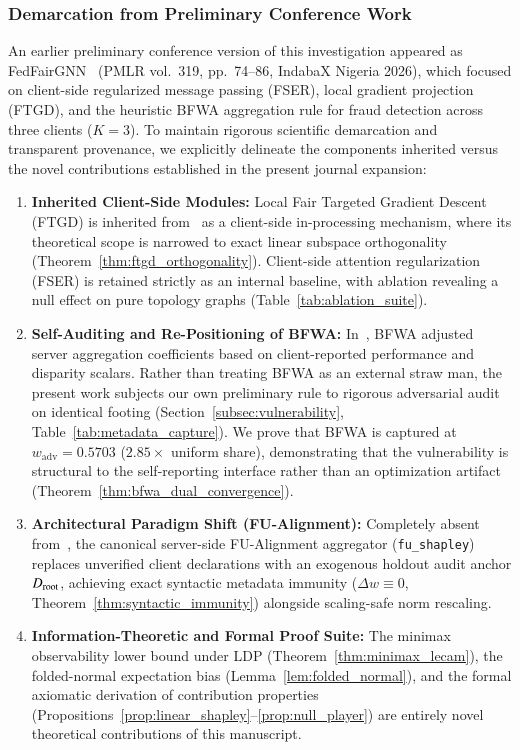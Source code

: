 \subsubsection{Demarcation from Preliminary Conference Work}
An earlier preliminary conference version of this investigation appeared as FedFairGNN~\citep{dang2026fedfairgnn} (PMLR vol.~319, pp.~74--86, IndabaX Nigeria 2026), which focused on client-side regularized message passing (FSER), local gradient projection (FTGD), and the heuristic BFWA aggregation rule for fraud detection across three clients ($K=3$). To maintain rigorous scientific demarcation and transparent provenance, we explicitly delineate the components inherited versus the novel contributions established in the present journal expansion:
\begin{enumerate}[leftmargin=*]
    \item \textbf{Inherited Client-Side Modules:} Local Fair Targeted Gradient Descent (FTGD) is inherited from~\citep{dang2026fedfairgnn} as a client-side in-processing mechanism, where its theoretical scope is narrowed to exact linear subspace orthogonality (Theorem~\ref{thm:ftgd_orthogonality}). Client-side attention regularization (FSER) is retained strictly as an internal baseline, with ablation revealing a null effect on pure topology graphs (Table~\ref{tab:ablation_suite}).
    \item \textbf{Self-Auditing and Re-Positioning of BFWA:} In~\citep{dang2026fedfairgnn}, BFWA adjusted server aggregation coefficients based on client-reported performance and disparity scalars. Rather than treating BFWA as an external straw man, the present work subjects our own preliminary rule to rigorous adversarial audit on identical footing (Section~\ref{subsec:vulnerability}, Table~\ref{tab:metadata_capture}). We prove that BFWA is captured at $w_{\mathrm{adv}} = 0.5703$ ($2.85\times$ uniform share), demonstrating that the vulnerability is structural to the self-reporting interface rather than an optimization artifact (Theorem~\ref{thm:bfwa_dual_convergence}).
    \item \textbf{Architectural Paradigm Shift (FU-Alignment):} Completely absent from~\citep{dang2026fedfairgnn}, the canonical server-side FU-Alignment aggregator (\texttt{fu\_shapley}) replaces unverified client declarations with an exogenous holdout audit anchor $D_{\mathrm{root}}$, achieving exact syntactic metadata immunity ($\Delta w \equiv 0$, Theorem~\ref{thm:syntactic_immunity}) alongside scaling-safe norm rescaling.
    \item \textbf{Information-Theoretic and Formal Proof Suite:} The minimax observability lower bound under LDP (Theorem~\ref{thm:minimax_lecam}), the folded-normal expectation bias (Lemma~\ref{lem:folded_normal}), and the formal axiomatic derivation of contribution properties (Propositions~\ref{prop:linear_shapley}--\ref{prop:null_player}) are entirely novel theoretical contributions of this manuscript.

\end{enumerate}
